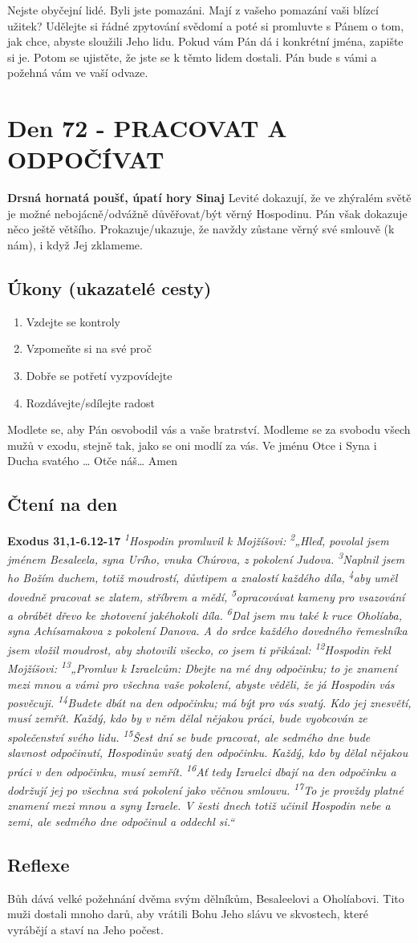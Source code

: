 \documentclass[11pt]{article}
\newcommand{\zacatekJedenactyTyden}{
\textbf{Drsná hornatá poušť, úpatí hory Sinaj} \newline 
Levité dokazují, že ve zhýralém světě je možné nebojácně/odvážně důvěřovat/být věrný Hospodinu. Pán však dokazuje něco ještě většího. Prokazuje/ukazuje, že navždy zůstane věrný své smlouvě (k nám), i když Jej zklameme.

\subsection*{Úkony (ukazatelé cesty)}
\begin{enumerate}
  \item Vzdejte se kontroly
  \item Vzpomeňte si na své proč
  \item Dobře se potřetí vyzpovídejte
  \item Rozdávejte/sdílejte radost
\end{enumerate}
Modlete se, aby Pán osvobodil vás a vaše bratrství. \newline
Modleme se za svobodu všech mužů v exodu, stejně tak, jako se oni modlí za vás.\newline
Ve jménu Otce i Syna i Ducha svatého …  Otče náš… Amen
}
\begin{document}
Nejste obyčejní lidé. Byli jste pomazáni. Mají z vašeho pomazání vaši blízcí užitek? Udělejte si řádné zpytování
svědomí a poté si promluvte s Pánem o tom, jak chce, abyste sloužili Jeho lidu. Pokud vám Pán dá i konkrétní jména,
zapište si je. Potom se ujistěte, že jste se k těmto lidem dostali. Pán bude s vámi a požehná vám ve vaší odvaze.


\newpage
\section{Den 72 - PRACOVAT A ODPOČÍVAT}
\zacatekJedenactyTyden
\subsection*{Čtení na den}
\textbf{Exodus 31,1-6.12-17}
\newline
\textit{
\textsuperscript{1}Hospodin promluvil k Mojžíšovi:
\textsuperscript{2}„Hleď, povolal jsem jménem Besaleela, syna Urího, vnuka Chúrova, z pokolení Judova.
\textsuperscript{3}Naplnil jsem ho Božím duchem, totiž moudrostí, důvtipem a znalostí každého díla,
\textsuperscript{4}aby uměl dovedně pracovat se zlatem, stříbrem a mědí,
\textsuperscript{5}opracovávat kameny pro vsazování a obrábět dřevo ke zhotovení jakéhokoli díla.
\textsuperscript{6}Dal jsem mu také k ruce Oholíaba, syna Achísamakova z pokolení Danova. A do srdce každého dovedného řemeslníka jsem vložil moudrost, aby zhotovili všecko, co jsem ti přikázal:
\newline
\newline
\textsuperscript{12}Hospodin řekl Mojžíšovi:
\textsuperscript{13}„Promluv k Izraelcům: Dbejte na mé dny odpočinku; to je znamení mezi mnou a vámi pro všechna vaše pokolení, abyste věděli, že já Hospodin vás posvěcuji.
\textsuperscript{14}Budete dbát na den odpočinku; má být pro vás svatý. Kdo jej znesvětí, musí zemřít. Každý, kdo by v něm dělal nějakou práci, bude vyobcován ze společenství svého lidu.
\textsuperscript{15}Šest dní se bude pracovat, ale sedmého dne bude slavnost odpočinutí, Hospodinův svatý den odpočinku. Každý, kdo by dělal nějakou práci v den odpočinku, musí zemřít.
\textsuperscript{16}Ať tedy Izraelci dbají na den odpočinku a dodržují jej po všechna svá pokolení jako věčnou smlouvu.
\textsuperscript{17}To je provždy platné znamení mezi mnou a syny Izraele. V šesti dnech totiž učinil Hospodin nebe a zemi, ale sedmého dne odpočinul a oddechl si.“
}

\subsection*{Reflexe}
Bůh dává velké požehnání dvěma svým dělníkům, Besaleelovi a Oholíabovi. Tito muži dostali mnoho darů, aby vrátili
Bohu Jeho slávu ve skvostech, které vyrábějí a staví na Jeho počest.
\end{document}

